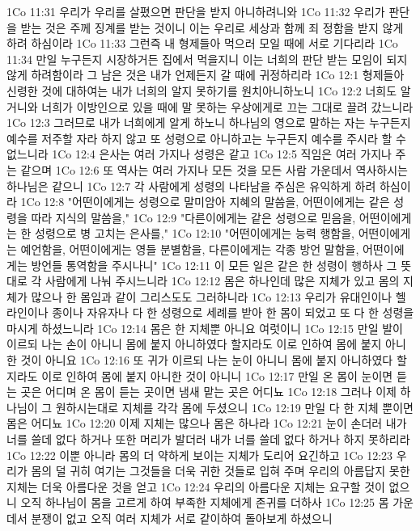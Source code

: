 1Co 11:31  우리가 우리를 살폈으면 판단을 받지 아니하려니와
1Co 11:32  우리가 판단을 받는 것은 주께 징계를 받는 것이니 이는 우리로 세상과 함께 죄 정함을 받지 않게 하려 하심이라
1Co 11:33  그런즉 내 형제들아 먹으러 모일 때에 서로 기다리라
1Co 11:34  만일 누구든지 시장하거든 집에서 먹을지니 이는 너희의 판단 받는 모임이 되지 않게 하려함이라 그 남은 것은 내가 언제든지 갈 때에 귀정하리라
1Co 12:1  형제들아 신령한 것에 대하여는 내가 너희의 알지 못하기를 원치아니하노니
1Co 12:2  너희도 알거니와 너희가 이방인으로 있을 때에 말 못하는 우상에게로 끄는 그대로 끌려 갔느니라
1Co 12:3  그러므로 내가 너희에게 알게 하노니 하나님의 영으로 말하는 자는 누구든지 예수를 저주할 자라 하지 않고 또 성령으로 아니하고는 누구든지 예수를 주시라 할 수 없느니라
1Co 12:4  은사는 여러 가지나 성령은 같고
1Co 12:5  직임은 여러 가지나 주는 같으며
1Co 12:6  또 역사는 여러 가지나 모든 것을 모든 사람 가운데서 역사하시는 하나님은 같으니
1Co 12:7  각 사람에게 성령의 나타남을 주심은 유익하게 하려 하심이라
1Co 12:8  "어떤이에게는 성령으로 말미암아 지혜의 말씀을, 어떤이에게는 같은 성령을 따라 지식의 말씀을,"
1Co 12:9  "다른이에게는 같은 성령으로 믿음을, 어떤이에게는 한 성령으로 병 고치는 은사를,"
1Co 12:10  "어떤이에게는 능력 행함을, 어떤이에게는 예언함을, 어떤이에게는 영들 분별함을, 다른이에게는 각종 방언 말함을, 어떤이에게는 방언들 통역함을 주시나니"
1Co 12:11  이 모든 일은 같은 한 성령이 행하사 그 뜻대로 각 사람에게 나눠 주시느니라
1Co 12:12  몸은 하나인데 많은 지체가 있고 몸의 지체가 많으나 한 몸임과 같이 그리스도도 그러하니라
1Co 12:13  우리가 유대인이나 헬라인이나 종이나 자유자나 다 한 성령으로 세례를 받아 한 몸이 되었고 또 다 한 성령을 마시게 하셨느니라
1Co 12:14  몸은 한 지체뿐 아니요 여럿이니
1Co 12:15  만일 발이 이르되 나는 손이 아니니 몸에 붙지 아니하였다 할지라도 이로 인하여 몸에 붙지 아니한 것이 아니요
1Co 12:16  또 귀가 이르되 나는 눈이 아니니 몸에 붙지 아니하였다 할지라도 이로 인하여 몸에 붙지 아니한 것이 아니니
1Co 12:17  만일 온 몸이 눈이면 듣는 곳은 어디며 온 몸이 듣는 곳이면 냄새 맡는 곳은 어디뇨
1Co 12:18  그러나 이제 하나님이 그 원하시는대로 지체를 각각 몸에 두셨으니
1Co 12:19  만일 다 한 지체 뿐이면 몸은 어디뇨
1Co 12:20  이제 지체는 많으나 몸은 하나라
1Co 12:21  눈이 손더러 내가 너를 쓸데 없다 하거나 또한 머리가 발더러 내가 너를 쓸데 없다 하거나 하지 못하리라
1Co 12:22  이뿐 아니라 몸의 더 약하게 보이는 지체가 도리어 요긴하고
1Co 12:23  우리가 몸의 덜 귀히 여기는 그것들을 더욱 귀한 것들로 입혀 주며 우리의 아름답지 못한 지체는 더욱 아름다운 것을 얻고
1Co 12:24  우리의 아름다운 지체는 요구할 것이 없으니 오직 하나님이 몸을 고르게 하여 부족한 지체에게 존귀를 더하사
1Co 12:25  몸 가운데서 분쟁이 없고 오직 여러 지체가 서로 같이하여 돌아보게 하셨으니
